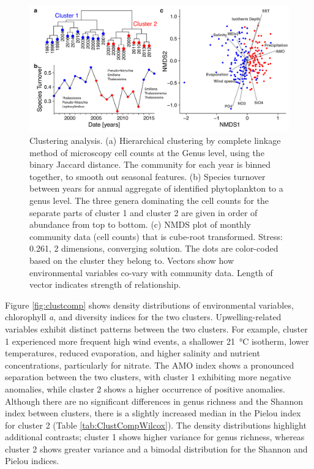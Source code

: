 \documentclass[draft]{agujournal2019}
\begin{document}
    \begin{figure}
    \noindent\includegraphics[width=\textwidth]{fig/Figure4_ClusteringNMDS_v2.pdf}
    \caption{Clustering analysis. (a) Hierarchical clustering by complete linkage method of microscopy cell counts at the Genus level, using the binary Jaccard distance. The community for each year is binned together, to smooth out seasonal features. (b) Species turnover between years for annual aggregate of identified phytoplankton to a genus level. The three genera dominating the cell counts for the separate parts of cluster 1 and cluster 2 are given in order of abundance from top to bottom. (c) NMDS plot of monthly community data (cell counts) that is cube-root transformed. Stress: 0.261, 2 dimensions, converging solution. The dots are color-coded based on the cluster they belong to. Vectors show how environmental variables co-vary with community data. Length of vector indicates strength of relationship.}
    \label{fig:clustering}
    \end{figure}
    
    Figure \ref{fig:clustcomp} shows density distributions of environmental variables, chlorophyll \textit{a}, and diversity indices for the two clusters. Upwelling-related variables exhibit distinct patterns between the two clusters. For example, cluster 1 experienced more frequent high wind events, a shallower \qty{21}{\celsius} isotherm, lower temperatures, reduced evaporation, and higher salinity and nutrient concentrations, particularly for nitrate. The AMO index shows a pronounced separation between the two clusters, with cluster 1 exhibiting more negative anomalies, while cluster 2 shows a higher occurrence of positive anomalies. Although there are no significant differences in genus richness and the Shannon index between clusters, there is a slightly increased median in the Pielou index for cluster 2 (Table \ref{tab:ClustCompWilcox}). The density distributions highlight additional contrasts; cluster 1 shows higher variance for genus richness, whereas cluster 2 shows greater variance and a bimodal distribution for the Shannon and Pielou indices. 
    
\end{document}
